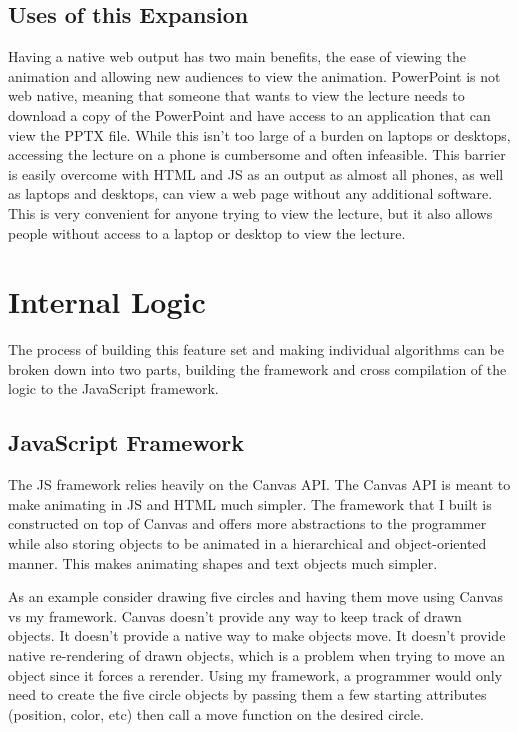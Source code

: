 \documentclass[12pt,twoside]{reedthesis}
\begin{document}
\subsection{Uses of this Expansion}
Having a native web output has two main benefits, the ease of viewing the animation and allowing new audiences to view the animation. PowerPoint is not web native, meaning that someone that wants to view the lecture needs to download a copy of the PowerPoint and have access to an application that can view the PPTX file. While this isn't too large of a burden on laptops or desktops, accessing the lecture on a phone is cumbersome and often infeasible. This barrier is easily overcome with HTML and JS as an output as almost all phones, as well as laptops and desktops, can view a web page without any additional software. This is very convenient for anyone trying to view the lecture, but it also allows people without access to a laptop or desktop to view the lecture. 

\section{Internal Logic}
The process of building this feature set and making individual algorithms can be broken down into two parts, building the framework and cross compilation of the logic to the JavaScript framework.

\subsection{JavaScript Framework}
The JS framework relies heavily on the Canvas API. The Canvas API is meant to make animating in JS and HTML much simpler. The framework that I built is constructed on top of Canvas and offers more abstractions to the programmer while also storing objects to be animated in a hierarchical and object-oriented manner. This makes animating shapes and text objects much simpler. 

As an example consider drawing five circles and having them move using Canvas vs my framework. Canvas doesn't provide any way to keep track of drawn objects. It doesn't provide a native way to make objects move. It doesn't provide native re-rendering of drawn objects, which is a problem when trying to move an object since it forces a rerender. Using my framework, a programmer would only need to create the five circle objects by passing them a few starting attributes (position, color, etc) then call a move function on the desired circle.
\end{document}
